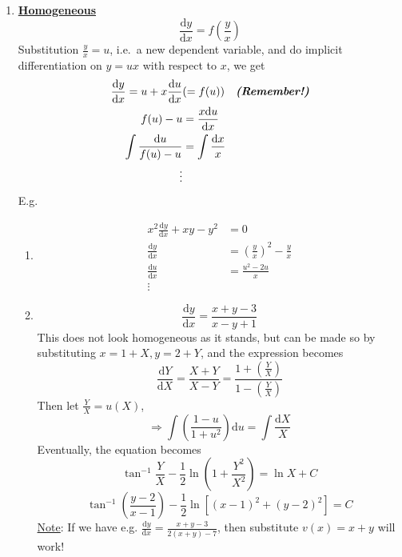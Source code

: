 \documentclass[12pt]{report}
\theoremstyle{definition}
\begin{document}
\begin{enumerate}[label = (\alph*)]
\item \textbf{\underline{Homogeneous}} \[
        \frac{\mathrm{d}y}{\mathrm{d}x} = f\left(\frac{y}{x}\right) 
    \]Substitution $\frac{y}{x} = u$,
    i.e.\ a new dependent variable, 
    and do implicit differentiation on $y=ux$ with respect to $x$,
    we get\[
        \begin{align*}
            \frac{\mathrm{d}y}{\mathrm{d}x} = u + x\frac{\mathrm{d}u}{\mathrm{d}x} & (= f(u)) 
            \quad \text{\textbf{\emph{(Remember!)}}} \\
            f(u) - u & = \frac{x\mathrm{d}u}{\mathrm{d}x} \\
            \int \frac{\mathrm{d}u}{f(u) - u} & = \int \frac{\mathrm{d}x}{x} \\
            \vdots
        \end{align*}
    \]
    E.g. 
    \begin{enumerate}[label = (\roman*)]
        \item \[
            \begin{align*}
                x^{2} \frac{\mathrm{d}y}{\mathrm{d}x} + xy - y^{2} & = 0 \\
                \frac{\mathrm{d}y}{\mathrm{d}x} & = {\left(\frac{y}{x}\right)}^{2} - \frac{y}{x} \\
                \frac{\mathrm{d}u}{\mathrm{d}x} & = \frac{u^{2} - 2u}{x} \\
                \vdots
            \end{align*}
        \]
    \item \[
        \frac{\mathrm{d}y}{\mathrm{d}x} = \frac{x + y - 3}{x - y + 1}
    \]This does not look homogeneous as it stands, but can be made so by substituting
    $x= 1 + X, y = 2 + Y$, and the expression becomes\[
        \frac{\mathrm{d}Y}{\mathrm{d}X} = \frac{X + Y}{X - Y} 
        = \frac{1 + \left(\frac{Y}{X}\right)}{1 - \left(\frac{Y}{X}\right)}
    \]Then let $\frac{Y}{X} = u(X)$,\[
    \Rightarrow \int \left(\frac{1-u}{1+u^2}\right) \mathrm{d}u = \int \frac{\mathrm{d}X}{X}
    \]
    Eventually, the equation becomes\[
        \tan^{-1}{\frac{Y}{X}} - \frac{1}{2} \ln{\left(1 + \frac{Y^2}{X^2}\right)} 
        = \ln{X} + C
    \]\[
    \tan^{-1}{\left(\frac{y-2}{x-1}\right)} - \frac{1}{2} \ln{\left[{(x-1)}^{2} + {(y-2)}^{2}\right] } = C
    \]
    \underline{Note}: If we have e.g. $\frac{\mathrm{d}y}{\mathrm{d}x} = \frac{x + y - 3}{2(x + y) - 7}$,
    then substitute $v(x) = x + y$ will work!
    \end{enumerate}


\end{enumerate}
\end{document}
